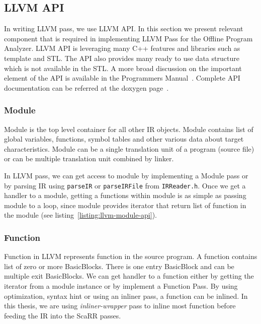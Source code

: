 \subsection{LLVM API}

In writing LLVM pass, we use LLVM API. In this section we present relevant
component that is required in implementing LLVM Pass for the Offline Program
Analyzer. LLVM API is leveraging many C++ features and libraries such as
template and STL. The API also provides many ready to use data structure which
is not available in the STL. A more broad discussion on the important element of
the API is available in the Programmers Manual~\cite{LLVMProgrammerManuala}.
Complete API documentation can be referred at the doxygen page~\cite{LLVMLLVMa}.

\subsubsection{Module}

Module is the top level container for all other IR objects. Module contains list
of global variables, functions, symbol tables and other various data about
target characteristics. Module can be a single translation unit of a program
(source file) or can be multiple translation unit combined by linker. 

In LLVM pass, we can get access to module by implementing a Module pass or by
parsing IR using \texttt{parseIR} or \texttt{parseIRFile} from
\texttt{IRReader.h}. Once we get a handler to a module, getting a functions
within module is as simple as passing module to a loop, since module provides
iterator that return list of function in the module (see
listing~\ref{listing:llvm-module-api}).


\subsubsection{Function}

Function in LLVM represents function in the source program. A function contains
list of zero or more BasicBlocks. There is one entry BasicBlock and can be
multiple exit BasicBlocks. We can get handler to a function either by getting
the iterator from a module instance or by implement a Function Pass. By using
optimization, syntax hint or using an inliner pass, a function can be inlined.
In this thesis, we are using \emph{inliner-wrapper} pass to inline most function
before feeding the IR into the ScaRR passes.

